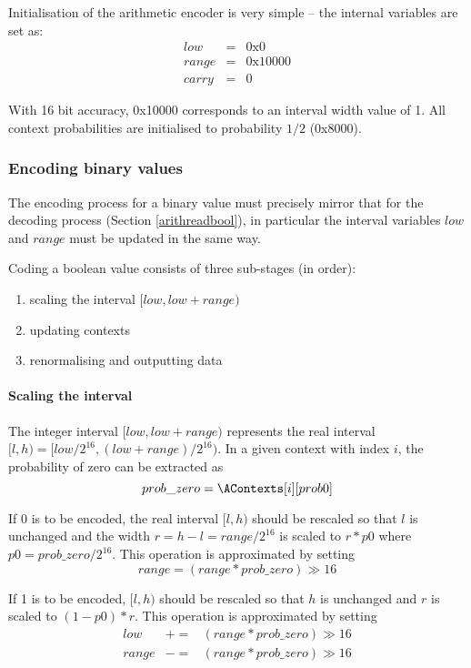 \begin{informative*}
Initialisation of the arithmetic encoder is very simple -- the internal variables are
set as:
\begin{eqnarray*}
low&=&\text{0x0} \\
range&=&\text{0x10000} \\
carry&=&0
\end{eqnarray*}

With 16 bit accuracy, 0x10000 corresponds to an interval width value of 1. All
context probabilities are initialised to probability $1/2$ (0x8000).

\subsubsection{Encoding binary values}
\label{arithwritebool}
The encoding process for a binary value must precisely mirror
that for the decoding process (Section \ref{arithreadbool}), in
particular the interval variables $low$ and $range$ must be
updated in the same way.

Coding a boolean value consists of three sub-stages (in order): 
\begin{enumerate}
\item{scaling the interval $[low,low+range)$}
\item{updating contexts}
\item{renormalising and outputting data}
\end{enumerate}

\paragraph*{Scaling the interval\\}
The integer interval $[low,low+range)$ represents the real interval
$[l,h)=[low/2^{16},(low+range)/2^{16})$. In a given context with index $i$,
the probability of zero can be extracted as 
\[prob\_zero=\AContexts[i][prob0]\]

If $0$ is to be encoded, the real interval $[l,h)$
should be rescaled so that $l$ is unchanged and the
width $r=h-l=range/2^{16}$ is scaled to $r*p0$ where $p0=prob\_zero/2^{16}$.
This operation is approximated by setting
\[range=(range*prob\_zero)\gg 16\]

If 1 is to be encoded, $[l,h)$ should be rescaled so that $h$ is
unchanged and $r$ is scaled to $(1-p0)*r$. This operation is
approximated by setting
\begin{eqnarray*}
low &+= & (range*prob\_zero)\gg 16 \\
range & -= & (range*prob\_zero)\gg 16
\end{eqnarray*}


\end{informative*}

